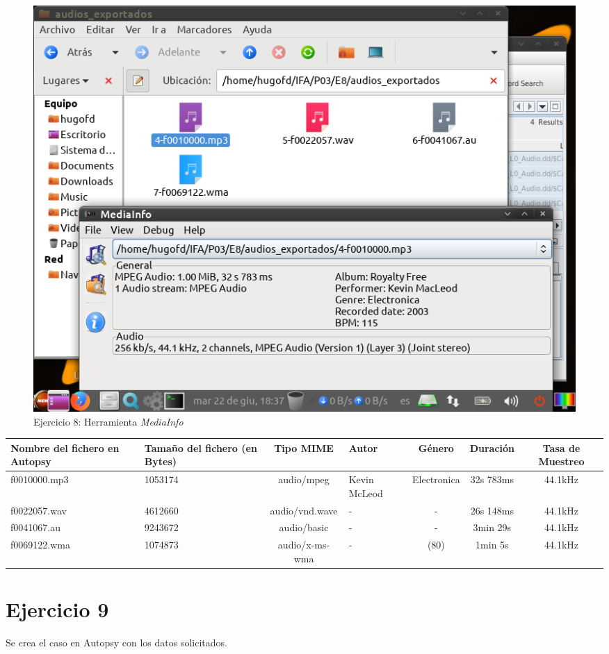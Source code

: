 \documentclass[11pt]{article}
\begin{document}
\begin{figure}[H]
    \caption{Ejercicio 8: Herramienta \textit{MediaInfo}}
    \centering
    \includegraphics[scale=0.7]{e8-6.png}
\end{figure}

\begin{table}[H]
    \centering
    \begin{tabular}{|p{2.5cm}|p{2cm}|c|p{1.5cm}|c|c|c|}
        \hline
        Nombre del fichero en Autopsy & Tamaño del fichero (en Bytes) & Tipo MIME & Autor & Género & Duración & Tasa de Muestreo \\
        \hline\hline
        f0010000.mp3 & 1053174 & audio/mpeg & Kevin McLeod & Electronica & 32s 783ms & 44.1kHz \\
        \hline
        f0022057.wav & 4612660 & audio/vnd.wave & - & - & 26s 148ms & 44.1kHz \\
        \hline
        f0041067.au & 9243672 & audio/basic & - & - & 3min 29s & 44.1kHz \\
        \hline
        f0069122.wma & 1074873 & audio/x-ms-wma & - & (80) & 1min 5s & 44.1kHz \\
        \hline
    \end{tabular}
\end{table}

\section{Ejercicio 9}
Se crea el caso en Autopsy con los datos solicitados.
\end{document}
